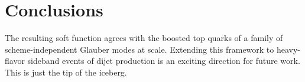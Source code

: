 \section{Conclusions}\label{sec:conclusions}

The resulting soft function agrees with the boosted top quarks of a
family of scheme-independent Glauber modes at scale. Extending this
framework to heavy-flavor sideband events of dijet production is an
exciting direction for future work. This is just the tip of the iceberg.

